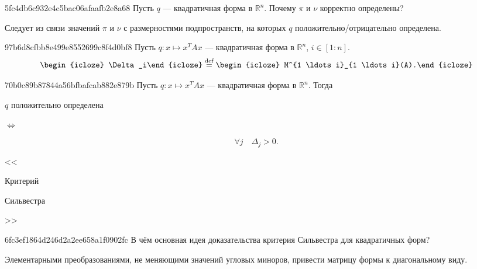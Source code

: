 \begin{note}{5fc4db6c932e4c5bac06afaafb2e8a68}
    Пусть \({ q }\) --- квадратичная форма в \({ \mathbb R^{n} }\).
    Почему \({ \pi }\) и \({ \nu }\) корректно определены?

    \begin{cloze}{1}
        Следует из связи значений \({ \pi }\) и \({ \nu }\) с размерностями подпространств, на которых \({ q }\) положительно/отрицательно определена.
    \end{cloze}
\end{note}

\begin{note}{97b6d8cfbb8e499e8552699c8f4d0bf8}
    Пусть \({ q : x \mapsto x^{T}Ax }\) --- квадратичная форма в \({ \mathbb R^{n} }\),\: \({ i \in [1 : n] }\).
    \[
        \begin{icloze}{2}\Delta_i\end{icloze} \overset{\text{def}}= \begin{icloze}{1}M^{1 \ldots i}_{1 \ldots i}(A).\end{icloze}
    \]
\end{note}

\begin{note}{70b0c89b87844a56bfbafcab882e879b}
    Пусть \({ q : x \mapsto x^{T}Ax }\) --- квадратичная форма в \({ \mathbb R^{n} }\).
    Тогда \begin{icloze}{2}\({ q }\) положительно определена\end{icloze} \begin{icloze}{3}\({ \iff }\)\end{icloze}
    \begin{icloze}{1}
        \[
            \forall j \quad \Delta_j > 0.
        \]
    \end{icloze}

    \begin{center}
        \tiny <<\begin{icloze}{3}Критерий\end{icloze} \begin{icloze}{4}Сильвестра\end{icloze}>>
    \end{center}
\end{note}

\begin{note}{6fc3ef1864d246d2a2ee658a1f0902fc}
    В чём основная идея доказательства критерия Сильвестра для квадратичных форм?

    \begin{cloze}{1}
        Элементарными преобразованиями, не меняющими значений угловых миноров, привести матрицу формы к диагональному виду.
    \end{cloze}
\end{note}

